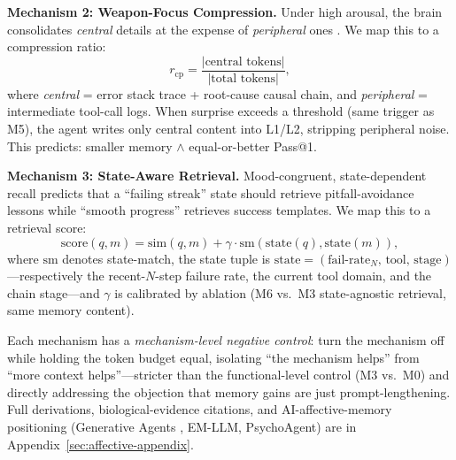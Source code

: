 \textbf{Mechanism 2: Weapon-Focus Compression.} Under high arousal, the brain consolidates \emph{central} details at the expense of \emph{peripheral} ones \cite{loftus1987}. We map this to a compression ratio:
\begin{equation}
\label{eq:weapon-focus}
r_{\text{cp}} = \frac{|\text{central tokens}|}{|\text{total tokens}|},
\end{equation}
where \emph{central} = error stack trace + root-cause causal chain, and \emph{peripheral} = intermediate tool-call logs. When surprise exceeds a threshold (same trigger as M5), the agent writes only central content into L1/L2, stripping peripheral noise. This predicts: smaller memory $\wedge$ equal-or-better Pass@1.

\textbf{Mechanism 3: State-Aware Retrieval.} Mood-congruent, state-dependent recall \cite{bower1981} predicts that a ``failing streak'' state should retrieve pitfall-avoidance lessons while ``smooth progress'' retrieves success templates. We map this to a retrieval score:
\begin{equation}
\label{eq:state-retrieval}
\text{score}(q, m) = \text{sim}(q, m) + \gamma \cdot \text{sm}(\text{state}(q), \text{state}(m)),
\end{equation}
where $\text{sm}$ denotes state-match, the state tuple is $\text{state}=(\text{fail-rate}_N,\,\text{tool},\,\text{stage})$---respectively the recent-$N$-step failure rate, the current tool domain, and the chain stage---and $\gamma$ is calibrated by ablation (M6 vs.\ M3 state-agnostic retrieval, same memory content).

Each mechanism has a \emph{mechanism-level negative control}: turn the mechanism off while holding the token budget equal, isolating ``the mechanism helps'' from ``more context helps''---stricter than the functional-level control (M3 vs.\ M0) and directly addressing the objection that memory gains are just prompt-lengthening. Full derivations, biological-evidence citations, and AI-affective-memory positioning (Generative Agents \cite{park2023}, EM-LLM, PsychoAgent) are in Appendix~\ref{sec:affective-appendix}.

